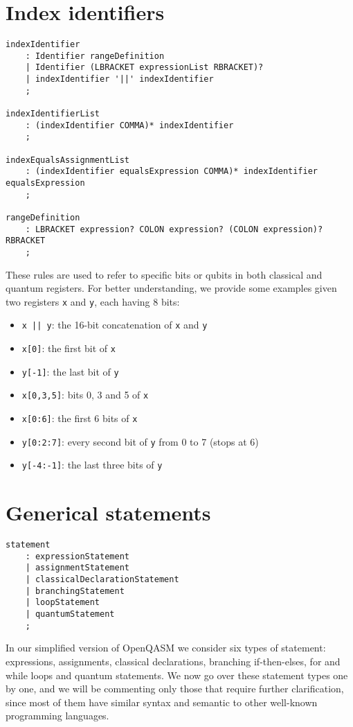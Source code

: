 \documentclass[12pt,a4paper]{report}
\theoremstyle{definition}
\theoremstyle{definition}
\theoremstyle{definition}
\begin{document}
\section{Index identifiers}
\begin{lstlisting}
indexIdentifier
    : Identifier rangeDefinition
    | Identifier (LBRACKET expressionList RBRACKET)?
    | indexIdentifier '||' indexIdentifier
    ;

indexIdentifierList
    : (indexIdentifier COMMA)* indexIdentifier
    ;

indexEqualsAssignmentList
    : (indexIdentifier equalsExpression COMMA)* indexIdentifier equalsExpression
    ;

rangeDefinition
    : LBRACKET expression? COLON expression? (COLON expression)? RBRACKET
    ;
\end{lstlisting}
These rules are used to refer to specific bits or qubits in both classical and quantum registers. For better understanding, we provide some examples given two registers \texttt{x} and \texttt{y}, each having 8 bits:
\begin{itemize}
    \itemsep 0em
    \item \texttt{x || y}: the 16-bit concatenation of \texttt{x} and \texttt{y}
    \item \texttt{x[0]}: the first bit of \texttt{x}
    \item \texttt{y[-1]}: the last bit of \texttt{y}
    \item \texttt{x[0,3,5]}: bits 0, 3 and 5 of \texttt{x}
    \item \texttt{x[0:6]}: the first 6 bits of \texttt{x}
    \item \texttt{y[0:2:7]}: every second bit of \texttt{y} from 0 to 7 (stops at 6)
    \item \texttt{y[-4:-1]}: the last three bits of \texttt{y}
\end{itemize}



\section{Generical statements}
\begin{lstlisting}
statement
    : expressionStatement
    | assignmentStatement
    | classicalDeclarationStatement
    | branchingStatement
    | loopStatement
    | quantumStatement
    ;
\end{lstlisting}
In our simplified version of OpenQASM we consider six types of statement: expressions, assignments, classical declarations, branching if-then-elses, for and while loops and quantum statements. We now go over these statement types one by one, and we will be commenting only those that require further clarification, since most of them have similar syntax and semantic to other well-known programming languages.\\
\end{document}
